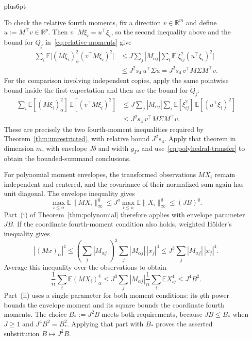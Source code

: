 \documentclass[11pt,letterpaper,twoside,leqno]{article}
\makeatletter
\theoremstyle{bookplain}
\theoremstyle{bookremark}
\renewenvironment{proof}[1][\proofname]{\par
  \pushQED{\qed}\normalfont\topsep6pt plus6pt\relax
  \trivlist\item[\hskip\labelsep\bfseries #1\@addpunct{.}]\ignorespaces
}{\popQED\endtrivlist\@endpefalse}
\newcommand{\E}{\mathbb E}
\newcommand{\R}{\mathbb R}
\makeatother
\begin{document}
\begin{proof}[Proof of Corollary~\ref{cor:polyhedral-transfer}]
To check the relative fourth moments, fix a direction $v\in\R^m$
and define $u:=M^\top v\in\R^p$. Then
$v^\top M\xi_i=u^\top\xi_i$, so the second inequality above and
the bound for $Q_j$ in~\eqref{eq:relative-moments} give
\[
 \begin{aligned}
 \sum_i\E\bigl[(M\xi_i)_\alpha^2(v^\top M\xi_i)^2\bigr]
 &\le J\sum_j|M_{\alpha j}|
           \sum_i\E\bigl[\xi_{ij}^2(u^\top\xi_i)^2\bigr]\\
 &\le J^2s_4\,u^\top\Sigma u
 =J^2s_4\,v^\top M\Sigma M^\top v.
 \end{aligned}
\]
For the comparison involving independent copies, apply the same
pointwise bound inside the first expectation and then use the bound
for $\widetilde Q_j$:
\[
 \begin{aligned}
 \sum_i\E[(M\xi_i)_\alpha^2]\,\E[(v^\top M\xi_i)^2]
 &\le J\sum_j|M_{\alpha j}|
             \sum_i\E[\xi_{ij}^2]\,\E[(u^\top\xi_i)^2]\\
 &\le J^2s_4\,v^\top M\Sigma M^\top v.
 \end{aligned}
\]
These are precisely the two fourth-moment inequalities required by
Theorem~\ref{thm:unrestricted}, with relative bound $J^2s_4$.
Apply that theorem in dimension $m$, with envelope $J\delta$ and
width $g_P$, and use~\eqref{eq:polyhedral-transfer} to obtain the
bounded-summand conclusions.

For polynomial moment envelopes, the transformed observations $MX_i$
remain independent and centered, and the covariance of their normalized
sum again has unit diagonal. The envelope inequality gives
\[
 \max_{i\le n}\E\|MX_i\|_\infty^q
 \le J^q\max_{i\le n}\E\|X_i\|_\infty^q\le(JB)^q.
\]
Part~\textup{(i)} of Theorem~\ref{thm:polynomial} therefore applies
with envelope parameter $JB$.
If the coordinate fourth-moment condition also holds, weighted
H\"older's inequality gives
\[
 |(Mx)_\alpha|^4
 \le\left(\sum_j|M_{\alpha j}|\right)^3
          \sum_j|M_{\alpha j}|\,|x_j|^4
 \le J^3\sum_j|M_{\alpha j}|\,|x_j|^4.
\]
Average this inequality over the observations to obtain
\[
 \frac1n\sum_i\E(MX_i)_\alpha^4
 \le J^3\sum_j|M_{\alpha j}|
               \frac1n\sum_i\E X_{ij}^4
 \le J^4B^2.
\]
Part~\textup{(ii)} uses a single parameter for both moment conditions:
its $q$th power bounds the envelope moment and its square bounds the
coordinate fourth moments. The choice $B_*:=J^2B$ meets both
requirements, because $JB\le B_*$ when $J\ge1$ and
$J^4B^2=B_*^2$.
Applying that part with $B_*$ proves the asserted substitution
$B\mapsto J^2B$.


\end{proof}
\end{document}
